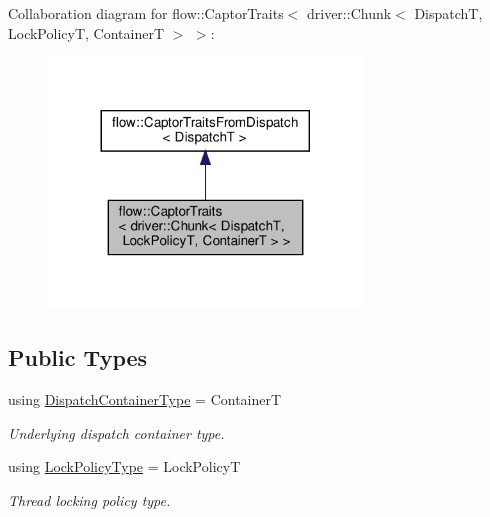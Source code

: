 Collaboration diagram for flow\+:\+:Captor\+Traits$<$ driver\+:\+:Chunk$<$ DispatchT, Lock\+PolicyT, ContainerT $>$ $>$\+:\nopagebreak
\begin{figure}[H]
\begin{center}
\leavevmode
\includegraphics[width=236pt]{structflow_1_1_captor_traits_3_01driver_1_1_chunk_3_01_dispatch_t_00_01_lock_policy_t_00_01_container_t_01_4_01_4__coll__graph}
\end{center}
\end{figure}
\subsection*{Public Types}
\begin{DoxyCompactItemize}
\item 
\mbox{\label{structflow_1_1_captor_traits_3_01driver_1_1_chunk_3_01_dispatch_t_00_01_lock_policy_t_00_01_container_t_01_4_01_4_a527163b458da2f4f3c644128d1aeb819}} 
using \hyperlink{structflow_1_1_captor_traits_3_01driver_1_1_chunk_3_01_dispatch_t_00_01_lock_policy_t_00_01_container_t_01_4_01_4_a527163b458da2f4f3c644128d1aeb819}{Dispatch\+Container\+Type} = ContainerT
\begin{DoxyCompactList}\small\item\em Underlying dispatch container type. \end{DoxyCompactList}\item 
\mbox{\label{structflow_1_1_captor_traits_3_01driver_1_1_chunk_3_01_dispatch_t_00_01_lock_policy_t_00_01_container_t_01_4_01_4_ae0fd66188ae32dd82d9b03de36747845}} 
using \hyperlink{structflow_1_1_captor_traits_3_01driver_1_1_chunk_3_01_dispatch_t_00_01_lock_policy_t_00_01_container_t_01_4_01_4_ae0fd66188ae32dd82d9b03de36747845}{Lock\+Policy\+Type} = Lock\+PolicyT
\begin{DoxyCompactList}\small\item\em Thread locking policy type. \end{DoxyCompactList}\end{DoxyCompactItemize}



